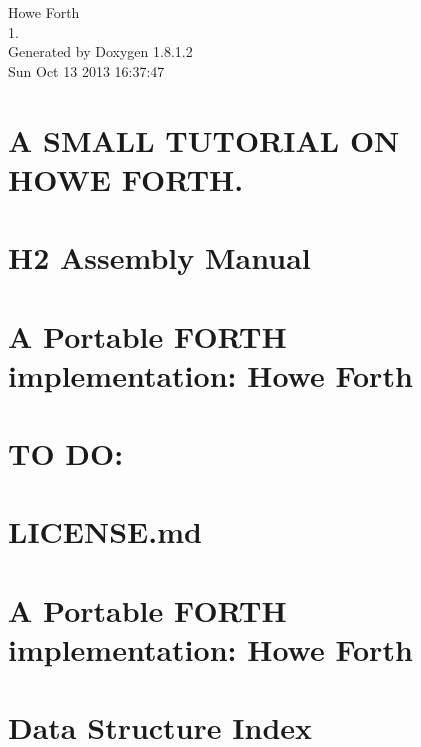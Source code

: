 \documentclass{book}
\begin{document}
\hypersetup{pageanchor=false,citecolor=blue}
\begin{titlepage}
\vspace*{7cm}
\begin{center}
{\Large Howe Forth \\[1ex]\large 1. }\\
\vspace*{1cm}
{\large Generated by Doxygen 1.8.1.2}\\
\vspace*{0.5cm}
{\small Sun Oct 13 2013 16:37:47}\\
\end{center}
\end{titlepage}
\clearemptydoublepage
{}
\tableofcontents
\clearemptydoublepage
{}
\hypersetup{pageanchor=true,citecolor=blue}
\chapter{A S\-M\-A\-L\-L T\-U\-T\-O\-R\-I\-A\-L O\-N H\-O\-W\-E F\-O\-R\-T\-H.}
\label{md_FORTH}
\hypertarget{md_FORTH}{}

\chapter{H2 Assembly Manual}
\label{md_H2_MANUAL}
\hypertarget{md_H2_MANUAL}{}

\chapter{A Portable F\-O\-R\-T\-H implementation\-: Howe Forth}
\label{md_MANUAL}
\hypertarget{md_MANUAL}{}

\chapter{T\-O D\-O\-:}
\label{md_TODO}
\hypertarget{md_TODO}{}

\chapter{L\-I\-C\-E\-N\-S\-E.\-md}
\label{md_LICENSE}
\hypertarget{md_LICENSE}{}

\chapter{A Portable F\-O\-R\-T\-H implementation\-: Howe Forth}
\label{md_README}
\hypertarget{md_README}{}

\chapter{Data Structure Index}

\end{document}
